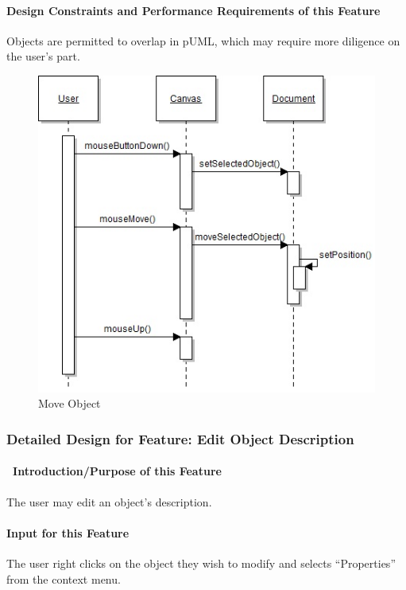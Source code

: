 \documentclass[twoside,letterpaper]{article}
\begin{document}
{\paragraph{Design Constraints and Performance Requirements of this Feature}
{
Objects are permitted to overlap in pUML, which may require more diligence on the user{\textquoteright}s part.
}
\bigskip

\begin{figure}[h]
\centering
\includegraphics[width=6.0in]{IntMoveObj.jpg}
\caption{ Move Object }
\end{figure}

\clearpage




% 
%

\subsubsection{Detailed Design for Feature: Edit Object Description}

\paragraph[\ Introduction/Purpose of this Feature]
{\ Introduction/Purpose of this Feature}
{
The user may edit an object{\textquoteright}s description.
}

\paragraph[Input for this Feature]{Input for this Feature}
{
The user right clicks on the object they wish to modify and selects ``Properties'' from the context menu.
}

}
\end{document}
